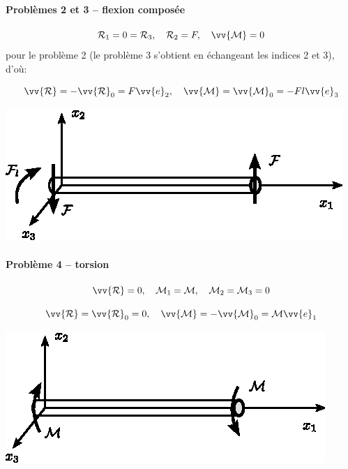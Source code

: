 \paragraph{Problèmes 2 et 3 -- flexion composée}
\begin{equation}
    \mathcal{R}_1 = 0 = \mathcal{R}_3, \quad \mathcal{R}_2 = F, \quad \vv{\mathcal{M}} = 0
    \label{eq:Ch07-010}
\end{equation}
pour le problème 2 (le problème 3 s'obtient en échangeant les indices 2 et 3), d'où:
\begin{multicols}{2}
    \begin{equation*}
        \vv{\mathcal{R}} = -\vv{\mathcal{R}}_0 = F \vv{e}_2, \quad \vv{\mathcal{M}} = \vv{\mathcal{M}}_0 = -F l \vv{e}_3
    \end{equation*}
    \columnbreak
    \begin{center}
        \includegraphics{../images/T1_Ch07-03}
    \end{center}
\end{multicols}
\paragraph{Problème 4 -- torsion}
\begin{equation}
    \vv{\mathcal{R}} = 0 , \quad \mathcal{M}_1 = \mathcal{M}, \quad \mathcal{M}_2 = \mathcal{M}_3 = 0
    \label{eq:Ch07-011}
\end{equation}
\begin{multicols}{2}
    \begin{equation*}
        \vv{\mathcal{R}} = \vv{\mathcal{R}}_0 = 0, \quad \vv{\mathcal{M}} = -\vv{\mathcal{M}}_0 = \mathcal{M} \vv{e}_1
    \end{equation*}
    \columnbreak
    \begin{center}
        \includegraphics{../images/T1_Ch07-04}
    \end{center}
\end{multicols}
